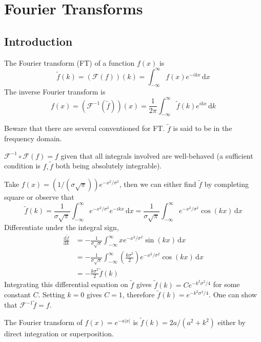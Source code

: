 \section{Fourier Transforms}
\subsection{Introduction}
\begin{definition}
    The Fourier transform (FT) of a function $f(x)$ is
    $$\tilde{f}(k)=(\mathcal F(f))(k)=\int_{-\infty}^\infty f(x)e^{-ikx}\,\mathrm dx$$
    The inverse Fourier transform is
    $$f(x)=(\mathcal F^{-1}(\tilde{f}))(x)=\frac{1}{2\pi}\int_{-\infty}^\infty\tilde{f}(k)e^{ikx}\,\mathrm dk$$
\end{definition}
Beware that there are several conventioned for FT.
$\tilde{f}$ is said to be in the frequency domain.
\begin{theorem}
    $\mathcal F^{-1}\circ\mathcal F(f)=f$ given that all integrals involved are well-behaved (a sufficient condition is $f,\tilde{f}$ both being absolutely integrable).
\end{theorem}
\begin{example}
    Take $f(x)=(1/(\sigma\sqrt\pi))e^{-x^2/\sigma^2}$, then we can either find $\tilde{f}$ by completing square or observe that
    $$\tilde{f}(k)=\frac{1}{\sigma\sqrt{\pi}}\int_{-\infty}^\infty e^{-x^2/\sigma^2}e^{-ikx}\,\mathrm dx=\frac{1}{\sigma\sqrt{\pi}}\int_{-\infty}^\infty e^{-x^2/\sigma^2}\cos(kx)\,\mathrm dx$$
    Differentiate under the integral sign,
    \begin{align*}
        \frac{\mathrm d\tilde{f}}{\mathrm dk}&=-\frac{1}{\sigma\sqrt\pi}\int_{-\infty}^\infty xe^{-x^2/\sigma^2}\sin(kx)\,\mathrm dx\\
        &=-\frac{1}{\sigma\sqrt\pi}\int_{-\infty}^\infty\left( \frac{k\sigma^2}{2} \right)e^{-x^2/\sigma^2}\cos(kx)\,\mathrm dx\\
        &=-\frac{k\sigma^2}{2}\tilde{f}(k)
    \end{align*}
    Integrating this differential equation on $\tilde{f}$ gives $\tilde{f}(k)=Ce^{-k^2\sigma^2/4}$ for some constant $C$.
    Setting $k=0$ gives $C=1$, therefore $\tilde{f}(k)=e^{-k^2\sigma^2/4}$.
    One can show that $\mathcal F^{-1}\tilde{f}=f$.
\end{example}
\begin{example}
    The Fourier transform of $f(x)=e^{-a|x|}$ is $\tilde{f}(k)=2a/(a^2+k^2)$ either by direct integration or superposition.
\end{example}
